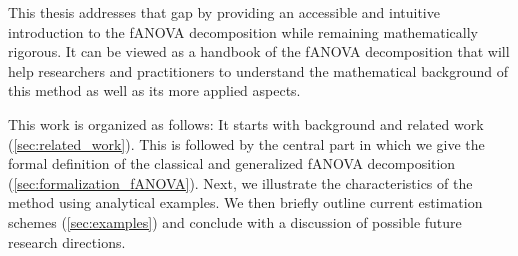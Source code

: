 This thesis addresses that gap by providing an accessible and intuitive introduction to the fANOVA decomposition while remaining mathematically rigorous.
It can be viewed as a handbook of the fANOVA decomposition that will help researchers and practitioners to understand the mathematical background of this method as well as its more applied aspects.\par

This work is organized as follows: It starts with background and related work (\autoref{sec:related_work}). This is followed by the central part in which we give the formal definition of the classical and generalized fANOVA decomposition (\autoref{sec:formalization_fANOVA}).
Next, we illustrate the characteristics of the method using analytical examples. We then briefly outline current estimation schemes (\autoref{sec:examples}) and conclude with a discussion of possible future research directions.
